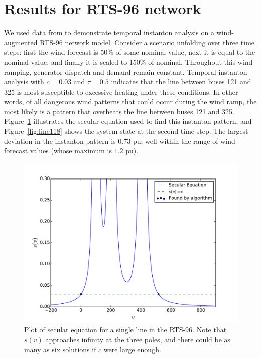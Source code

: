 \documentclass[conference]{IEEEtran}
\begin{document}
\section{Results for RTS-96 network}\label{sec:results}

We used data from \cite{pandzic} to demonstrate temporal instanton
analysis on a wind-augmented RTS-96 network model. Consider a scenario
unfolding over three time steps: first the wind forecast is 50\% of
some nominal value, next it is equal to the nominal value, and finally
it is scaled to 150\% of nominal. Throughout this wind ramping,
generator dispatch and demand remain constant. Temporal instanton
analysis with $c=0.03$ and $\tau=0.5$ indicates that the line between
buses 121 and 325 is most susceptible to excessive heating under these
conditions. In other words, of all dangerous wind patterns that could
occur during the wind ramp, the most likely is a pattern that
overheats the line between buses 121 and 325. Figure~\ref{fig:secular}
illustrates the secular equation used to find this instanton pattern,
and Figure~\ref{fig:line118} shows the system state at the second time
step. The largest deviation in the instanton pattern is $0.73$ pu,
well within the range of wind forecast values (whose maximum is $1.2$
pu).


\begin{figure}[t]
\centering
\includegraphics[trim=0in 0in 0.5in 0.5in,clip,width=1\linewidth]{secular}
\caption{Plot of secular equation for a single line in the RTS-96. Note that $s(v)$ approaches infinity at the three poles, and there could be as many as six solutions if $c$ were large enough.}
\label{fig:secular}
\end{figure}
\end{document}
